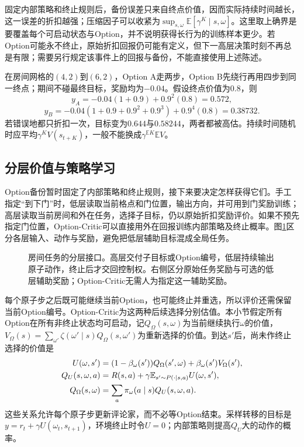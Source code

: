 固定内部策略和终止规则后，备份误差只来自终点价值，因而实际持续时间越长，这一误差的折扣越强；压缩因子可以收紧为$\sup_{s,\omega}\mathbb E[\gamma^K\mid s,\omega]$。这里取上确界是要覆盖每个可启动状态与Option，并不说明获得长行为的训练样本更少。若Option可能永不终止，原始折扣回报仍可能有定义，但下一高层决策时刻不再总是有限；需要另行规定该事件上的回报与备份，不能直接使用上述陈述。

\begin{example}[持续时间不能忽略]
  \label{ex:rl-learning-option-duration}
  在房间网格的$(4,2)$到$(6,2)$，Option A走两步，Option B先绕行再用四步到同一终点；期间不碰最终目标，奖励均为$-0.04$。假设终点价值为$0.8$，则
  \[
    y_A=-0.04(1+0.9)+0.9^2(0.8)=0.572,
  \]
  \[
    y_B=-0.04(1+0.9+0.9^2+0.9^3)+0.9^4(0.8)=0.38732.
  \]
  若错误地都只折扣一次，目标变为$0.644$与$0.58244$，两者都被高估。持续时间随机时应平均$\gamma^K V(s_{t+K})$，一般不能换成$\gamma^{\mathbb E K}\mathbb E V$。
\end{example}

\subsection{分层价值与策略学习}
\label{sec:rl-learning-hierarchical-learning}

Option备份暂时固定了内部策略和终止规则，接下来要决定怎样获得它们。手工指定“到下门”时，低层读取当前格点和门位置，输出方向，并可用到门奖励训练；高层读取当前房间和外在任务，选择子目标，仍以原始折扣奖励评价。如果不预先指定门位置，Option-Critic可以直接用外在回报训练内部策略及终止概率。图\ref{fig:rl-learning-hierarchy}区分各层输入、动作与奖励，避免把低层辅助目标混成全局任务。

\begin{figure}[t]
  \centering
  
  \caption{房间任务的分层接口。高层交付子目标或Option编号，低层持续输出原子动作，终止后才交回控制权。右侧区分原始任务奖励与可选的低层辅助奖励；Option-Critic无需人为指定这一辅助奖励。}
  \label{fig:rl-learning-hierarchy}
\end{figure}

每个原子步之后既可能继续当前Option，也可能终止并重选，所以评价还需保留当前Option编号。Option-Critic为这两种后续选择分别估值。本小节假定所有Option在所有非终止状态均可启动，记$Q_\Omega(s,\omega)$为当前继续执行$\omega$的价值，
$V_\Omega(s)=\sum_{\omega'}\zeta(\omega'\mid s)Q_\Omega(s,\omega')$为重新选择的价值。到达$s'$后，尚未作终止选择的价值是
\begin{align}
 U(\omega,s')
   &=(1-\beta_\omega(s'))Q_\Omega(s',\omega)
                               +\beta_\omega(s')V_\Omega(s'),\notag\\
 Q_U(s,\omega,a)
   &=R(s,a)+\gamma\mathbb E_{s'\sim P(\cdot\mid s,a)}U(\omega,s'),\notag\\
 Q_\Omega(s,\omega)&=\sum_a\pi_\omega(a\mid s)Q_U(s,\omega,a).
 \label{eq:rl-learning-option-critic}
\end{align}
这些关系允许每个原子步更新评论家，而不必等Option结束。采样转移的目标是
$y=r_t+\gamma U(\omega_t,s_{t+1})$，环境终止时令$U=0$；内部策略则提高$Q_U$大的动作的概率。


